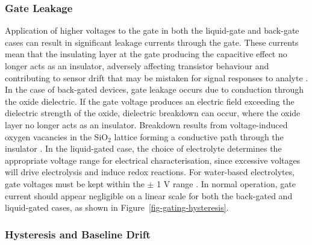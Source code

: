\documentclass[
  a4paper,
]{scrbook}
\begin{document}
\hypertarget{gate-leakage}{%
\subsubsection*{Gate Leakage}\label{gate-leakage}}

Application of higher voltages to the gate in both the liquid-gate and
back-gate cases can result in significant leakage currents through the
gate. These currents mean that the insulating layer at the gate
producing the capacitive effect no longer acts as an insulator,
adversely affecting transistor behaviour and contributing to sensor
drift that may be mistaken for signal responses to analyte
\autocite{Noyce2019,Shkodra2021,Albarghouthi2022}. In the case of
back-gated devices, gate leakage occurs due to conduction through the
oxide dielectric. If the gate voltage produces an electric field
exceeding the dielectric strength of the oxide, dielectric breakdown can
occur, where the oxide layer no longer acts as an insulator. Breakdown
results from voltage-induced oxygen vacancies in the SiO\(_2\) lattice
forming a conductive path through the insulator \autocite{Padovani2017}.
In the liquid-gated case, the choice of electrolyte determines the
appropriate voltage range for electrical characterisation, since
excessive voltages will drive electrolysis and induce redox reactions.
For water-based electrolytes, gate voltages must be kept within the
\(\pm\) 1 V range \autocite{Wang2010,Ohno2015,Shkodra2021}. In normal
operation, gate current should appear negligible on a linear scale for
both the back-gated and liquid-gated cases, as shown in
Figure~\ref{fig-gating-hysteresis}.

\hypertarget{hysteresis-and-baseline-drift}{%
\subsubsection*{Hysteresis and Baseline
Drift}\label{hysteresis-and-baseline-drift}}
\end{document}
